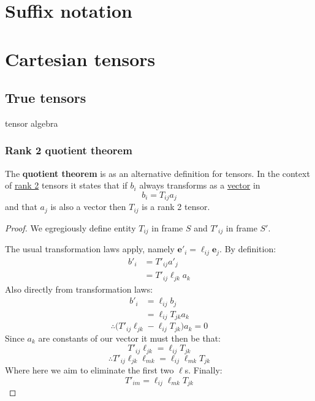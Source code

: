 \documentclass{article}
\begin{document}
\pagestyle{fancy}
\fancyhead{}

\tableofcontents

\newpage

\section{Suffix notation}

\section{Cartesian tensors}

\subsection{True tensors}
tensor algebra

\subsubsection{Rank 2 quotient theorem}
The \textbf{quotient theorem} is as an alternative definition for tensors. In the context of \underline{rank 2} tensors it states that if $b_i$ always transforms as a \underline{vector} in
$$b_i=T_{ij}a_j$$
and that $a_j$ is also a vector then $T_{ij}$ is a rank 2 tensor.
\begin{proof}
    We egregiously define entity $T_{ij}$ in frame $S$ and $T'_{ij}$ in frame $S'$.

    The usual transformation laws apply, namely $\boldsymbol{e}'_i=\ell_{ij}\boldsymbol{e}_j$. By definition:
    \begin{align*}
        b'_i
        &=T'_{ij}a'_j \\
        &=T'_{ij}\ell_{jk}a_k
    \end{align*}
    Also directly from transformation laws:
    \begin{align*}
        b'_i
        &=\ell_{ij}b_j \\
        &=\ell_{ij}T_{jk}a_k
    \end{align*}
    $$\therefore\bigl(T'_{ij}\ell_{jk}-\ell_{ij}T_{jk}\bigl)a_k=0$$
    Since $a_k$ are constants of our vector it must then be that:
    $$T'_{ij}\ell_{jk}=\ell_{ij}T_{jk}$$
    $$\therefore T'_{ij}\ell_{jk}\ell_{mk}=\ell_{ij}\ell_{mk}T_{jk}$$
    Where here we aim to eliminate the first two $\ell$s. Finally:
    $$T'_{im}=\ell_{ij}\ell_{mk}T_{jk}$$
\end{proof}
\end{document}
